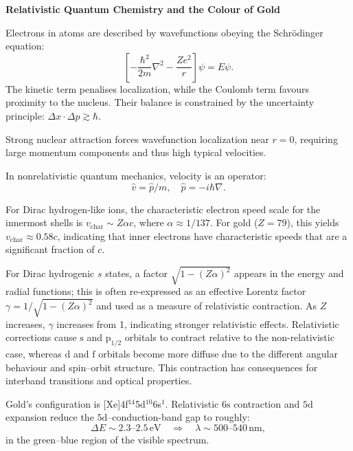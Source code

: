 \begin{technical}
    \sloppy
    {\Large\textbf{Relativistic Quantum Chemistry and the Colour of Gold}}\\[0.3em]
    
    
    Electrons in atoms are described by wavefunctions obeying the Schrödinger equation:
    \[
    \left[ -\frac{\hbar^2}{2m} \nabla^2 - \frac{Ze^2}{r} \right] \psi = E \psi.
    \]
    The kinetic term penalises localization, while the Coulomb term favours proximity to the nucleus. Their balance is constrained by the uncertainty principle: $\Delta x \cdot \Delta p \gtrsim \hbar$.
    
    Strong nuclear attraction forces wavefunction localization near $r = 0$, requiring large momentum components and thus high typical velocities.
    
    In nonrelativistic quantum mechanics, velocity is an operator:
    \[
    \hat{v} = \hat{p}/m, \quad \hat{p} = -i\hbar \nabla.
    \]

    For Dirac hydrogen-like ions, the characteristic electron speed scale for the innermost shells is $v_{\text{char}} \sim Z\alpha c$, where $ \alpha \approx 1/137 $. For gold (\(Z = 79\)), this yields \(v_{\text{char}} \approx 0.58c\), indicating that inner electrons have characteristic speeds that are a significant fraction of $c$.
    

    For Dirac hydrogenic $s$ states, a factor $\sqrt{1-(Z\alpha)^2}$ appears in the energy and radial functions; this is often re-expressed as an effective \QSOpen{}Lorentz factor\QSClose{} $\gamma = 1/\sqrt{1-(Z\alpha)^2}$ and used as a measure of relativistic contraction. As \(Z\) increases, \(\gamma\) increases from 1, indicating stronger relativistic effects. Relativistic corrections cause $\mathrm{s}$ and $\mathrm{p}_{1/2}$ orbitals to contract relative to the non-relativistic case, whereas $\mathrm{d}$ and $\mathrm{f}$ orbitals become more diffuse due to the different angular behaviour and spin–orbit structure. This contraction has consequences for interband transitions and optical properties.
    
    
    Gold's configuration is [Xe]4f$^{14}$5d$^{10}$6s$^1$. Relativistic $6\mathrm{s}$ contraction and $5\mathrm{d}$ expansion reduce the $5\mathrm{d}$–conduction-band gap to roughly:
    \[
    \Delta E \sim 2.3\text{–}2.5\,\text{eV} \quad \Rightarrow \quad \lambda \sim 500\text{–}540\,\text{nm},
    \]
    in the green–blue region of the visible spectrum.
    

\end{technical}
